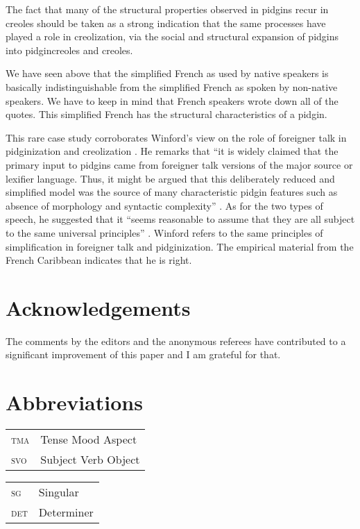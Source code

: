 \documentclass[output=paper,colorlinks,citecolor=brown]{langscibook}
\begin{document}
The fact that many of the structural properties observed in pidgins recur in creoles should be taken as a strong indication that the same processes have played a role in creolization, via the social and structural expansion of pidgins into pidgincreoles and creoles.

We have seen above that the simplified French as used by native speakers is basically indistinguishable from the simplified French as spoken by non-native speakers. We have to keep in mind that French speakers wrote down all of the quotes. This simplified French has the structural characteristics of a pidgin. 

This rare case study corroborates Winford’s view on the role of foreigner talk in pidginization and creolization \citet[279, 287, 290, 298]{winford2003book}. He remarks that “it is widely claimed that the primary input to pidgins came from foreigner talk versions of the major source or lexifier language. Thus, it might be argued that this deliberately reduced and simplified model was the source of many characteristic pidgin features such as absence of morphology and syntactic complexity” \citep[279]{winford2003book}. As for the two types of speech, he suggested that it “seems reasonable to assume that they are all subject to the same universal principles” \citep[287]{winford2003book}. Winford refers to the same principles of simplification in foreigner talk and pidginization. The empirical material from the French Caribbean indicates that he is right.

\section*{Acknowledgements}
 
The comments by the editors and the anonymous referees have contributed to a significant improvement of this paper and I am grateful for that.

\section*{Abbreviations}
\begin{tabularx}{.5\textwidth}{@{}lQ}
\textsc{tma}&  Tense Mood Aspect \\
\textsc{svo} &  Subject Verb Object\\
\end{tabularx}\begin{tabularx}{.5\textwidth}{lQ@{}}
\textsc{sg} & Singular\\
\textsc{det} & Determiner\\
\end{tabularx}

\printbibliography[heading=subbibliography,notkeyword=this]
\end{document}
